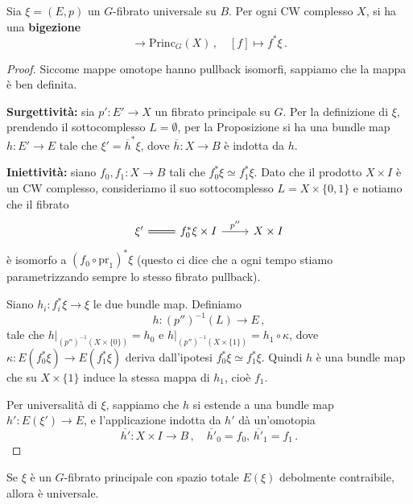 \begin{thm}
	Sia $\xi = (E,p)$ un $G$-fibrato universale su $B$.
	Per ogni CW complesso $X$, si ha una \textbf{bigezione}
	\begin{equation*}
		[X,B] \longrightarrow \mathrm{Princ}_{G}(X)\,,
		\quad [f] \longmapsto f^{*}\xi\,. 
	\end{equation*}
	\begin{proof}
		Siccome mappe omotope hanno pullback isomorfi,
		sappiamo che la mappa è ben definita.
		
		\textbf{Surgettività:} sia $p':E' \to X$ un fibrato principale su $G$.
		Per la definizione di $\xi$, prendendo il sottocomplesso $L = \emptyset$,
		per la Proposizione
		si ha una bundle map $h : E' \to E$ tale che $\xi' = \overline{h}^{*}\xi$,
		dove $\overline{h}:X \to B$ è indotta da $h$.
		
		\textbf{Iniettività:} siano $f_{0},f_{1}:X \to B$ tali che $f_{0}^{*}\xi \simeq f_{1}^{*}\xi$.
		Dato che il prodotto $X \times I$ è un CW complesso, consideriamo il suo sottocomplesso
		$L = X \times \{0,1\}$ e notiamo che il fibrato
		\begin{equation*}
			\begin{tikzcd}
				\xi' \ar[r, equals]
				& f_{0}^{*}\xi \times I \ar[r, " p'' "]
				& X \times I
			\end{tikzcd}
		\end{equation*}
		è isomorfo a $(f_{0} \circ \mathrm{pr}_{1})^{*}\xi$
		(questo ci dice che a ogni tempo stiamo parametrizzando sempre lo stesso fibrato pullback).
		
		Siano $h_{i}:f_{i}^{*}\xi 	\to \xi$ le due bundle map.
		Definiamo 
		\begin{equation*}
			h: \left( p'' \right)^{-1}(L) \longrightarrow E\,,
		\end{equation*}
		tale che $h\vert_{\left( p'' \right)^{-1}(X \times \{0\})} = h_{0}$
		e $h\vert_{\left( p'' \right)^{-1}(X \times \{1\})} = h_{1} \circ \kappa$,
		dove $\kappa : E(f_{0}^{*}\xi) \to E(f_{1}^{*}\xi)$ deriva
		dall'ipotesi $f_{0}^{*}\xi \simeq f_{1}^{*}\xi$.
		Quindi $h$ è una bundle map che su $X \times \{1\}$
		induce la stessa mappa di $h_{1}$, cioè $f_{1}$.
		
		Per universalità di $\xi$, sappiamo che $h$ si estende a una bundle map $h':E(\xi') \to E$,
		e l'applicazione indotta da $h'$ dà un'omotopia
		\begin{equation*}
			\overline{h'} : X \times I \longrightarrow B\,,
			\quad \overline{h'}_{0} = f_{0},\, \overline{h'}_{1} = f_{1}\,.
		\end{equation*}
	\end{proof}
\end{thm}

\begin{thm}
	Se $\xi$ è un $G$-fibrato principale con spazio totale $E(\xi)$
	debolmente contraibile, allora è universale.
\end{thm}